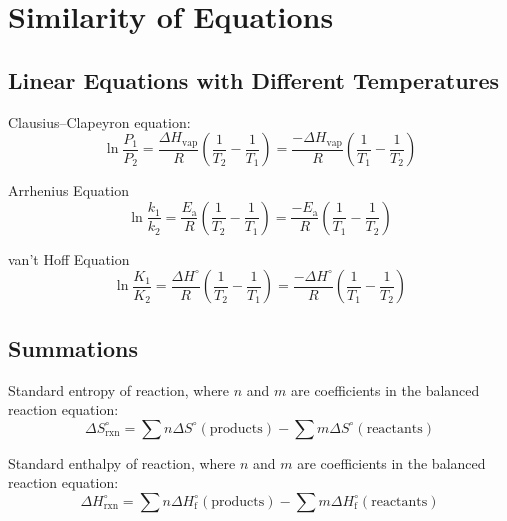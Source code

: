 \documentclass[10pt]{article}
\def\not{^\circ}
\begin{document}

\section{Similarity of Equations}

\subsection{Linear Equations with Different Temperatures}

Clausius--Clapeyron equation:
\begin{equation*}
\ln \frac{P_1}{P_2} = \frac{\Delta H_\textrm{vap}}{R}\left(\frac{1}{T_2} - \frac{1}{T_1}\right) = \frac{-\Delta H_\textrm{vap}}{R}\left(\frac{1}{T_1} - \frac{1}{T_2}\right)
\end{equation*}

Arrhenius Equation
\begin{equation*}
\ln \frac{k_1}{k_2} = \frac{E_\textrm{a}}{R}\left(\frac{1}{T_2} - \frac{1}{T_1}\right) = \frac{-E_\textrm{a}}{R}\left(\frac{1}{T_1}-\frac{1}{T_2}\right)
\end{equation*}

van't Hoff Equation
\begin{equation*}
\ln \frac{K_1}{K_2} = \frac{\Delta H^\circ}{R}\left(\frac{1}{T_2}-\frac{1}{T_1}\right) = \frac{-\Delta H^\circ}{R}\left(\frac{1}{T_1}-\frac{1}{T_2}\right)
\end{equation*}

\subsection{Summations}

Standard entropy of reaction, where $n$ and $m$ are coefficients in the balanced reaction equation:
\begin{equation*}
\Delta S\not_\textrm{rxn} = \sum{n\Delta S\not(\textrm{products})}-\sum{m\Delta S\not(\textrm{reactants})}
\end{equation*}

Standard enthalpy of reaction, where $n$ and $m$ are coefficients in the balanced reaction equation:
\begin{equation*}
\Delta H\not_\textrm{rxn} = \sum{n\Delta H\not_\textrm{f}(\textrm{products})}-\sum{m\Delta H\not_\textrm{f}(\textrm{reactants})}
\end{equation*}
\end{document}
